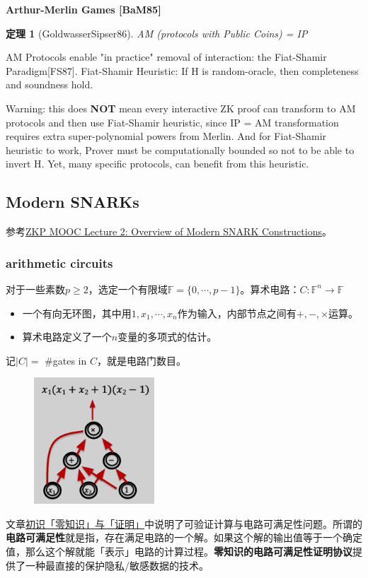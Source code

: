 \documentclass[10pt]{ctexart}
\newtheorem{theorem}{定理}
\begin{document}
\textbf{Arthur-Merlin Games [BaM85]}
\begin{theorem}[GoldwasserSipser86]
	AM (protocols with Public Coins) = IP
\end{theorem}
AM Protocols enable "in practice" removal of interaction: the Fiat-Shamir Paradigm[FS87].
Fiat-Shamir Heuristic:
If H is random-oracle, then completeness and soundness hold.

Warning: this does \textbf{NOT} mean every interactive ZK proof can transform to AM
protocols and then use Fiat-Shamir heuristic, since IP = AM transformation requires extra super-polynomial powers from Merlin. And for Fiat-Shamir heuristic to work, Prover must be computationally bounded so not to be able to invert H. Yet, many specific protocols, can benefit from this heuristic.

\subsection{Modern SNARKs}
参考\href{https://www.youtube.com/watch?v=bGEXYpt3sj0}{ZKP MOOC Lecture 2: Overview of Modern SNARK Constructions}。

\subsubsection{arithmetic circuits}
对于一些素数$p \ge 2$，选定一个有限域$\mathbb{F} = \{0, \cdots, p-1\}$。算术电路：$C: \mathbb{F}^n \rightarrow \mathbb{F}$
\begin{itemize}
	\item 一个有向无环图，其中用$1,x_1,\cdots,x_n$作为输入，内部节点之间有$+,-,\times$运算。
	\item 算术电路定义了一个$n$变量的多项式的估计。
\end{itemize}
记$|C| =$ \#gates in $C$，就是电路门数目。
\begin{figure}[H]
    \centering
    \includegraphics[width=0.4\textwidth]{./img/arithmetic_circuit.png} 
\end{figure}
文章\href{https://secbit.io/blog/2019/07/31/zero-knowledge-and-proof/}{初识「零知识」与「证明」}中说明了可验证计算与电路可满足性问题。所谓的\textbf{电路可满足性}就是指，存在满足电路的一个解。如果这个解的输出值等于一个确定值，那么这个解就能「表示」电路的计算过程。\textbf{零知识的电路可满足性证明协议}提供了一种最直接的保护隐私/敏感数据的技术。
\end{document}
